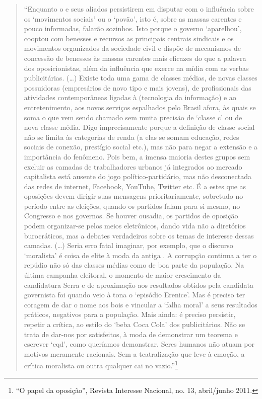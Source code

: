 \begin{quote}
``Enquanto o  e seus aliados persistirem em disputar com o 
influência sobre os `movimentos sociais' ou o `povão', isto é, sobre as
massas carentes e pouco informadas, falarão sozinhos. Isto porque o
governo `aparelhou', cooptou com benesses e recursos as principais
centrais sindicais e os movimentos organizados da sociedade civil e
dispõe de mecanismos de concessão de benesses às massas carentes mais
eficazes do que a palavra dos oposicionistas, além da influência que
exerce na mídia com as verbas publicitárias. (…) Existe toda uma gama
de classes médias, de novas classes possuidoras (empresários de novo
tipo e mais jovens), de profissionais das atividades contemporâneas
ligadas à  (tecnologia da informação) e ao entretenimento, aos novos
serviços espalhados pelo Brasil afora, às quais se soma o que vem sendo
chamado sem muita precisão de `classe c' ou de nova classe média. Digo
imprecisamente porque a definição de classe social não se limita às
categorias de renda (a elas se somam educação, redes sociais de conexão,
prestígio social etc.), mas não para negar a extensão e a importância
do fenômeno. Pois bem, a imensa maioria destes grupos sem excluir as
camadas de trabalhadores urbanos já integrados ao mercado capitalista
está ausente do jogo político-partidário, mas não desconectada das redes
de internet, Facebook, YouTube, Twitter etc. É a estes que as oposições
devem dirigir suas mensagens prioritariamente, sobretudo no período
entre as eleições, quando os partidos falam para si mesmo, no Congresso
e nos governos. Se houver ousadia, os partidos de oposição podem
organizar-se pelos meios eletrônicos, dando vida não a diretórios
burocráticos, mas a debates verdadeiros sobre os temas de interesse
dessas camadas. (…) Seria erro fatal imaginar, por exemplo, que o
discurso `moralista' é coisa de elite à moda da antiga . A corrupção
continua a ter o repúdio não só das classes médias como de boa parte da
população. Na última campanha eleitoral, o momento de maior crescimento
da candidatura Serra e de aproximação aos resultados obtidos pela
candidata governista foi quando veio à tona o `episódio Erenice'. Mas é
preciso ter coragem de dar o nome aos bois e vincular a `falha moral' a
seus resultados práticos, negativos para a população. Mais ainda: é
preciso persistir, repetir a crítica, ao estilo do `beba Coca Cola' dos
publicitários. Não se trata de dar-nos por satisfeitos, à moda de
demonstrar um teorema e escrever `cqd', como queríamos demonstrar. Seres
humanos não atuam por motivos meramente racionais. Sem a teatralização
que leve à emoção, a crítica moralista ou outra qualquer cai no
vazio.''\footnote{``O papel da oposição'', Revista Interesse Nacional,
  no. 13, abril/junho 2011.}
\end{quote}


